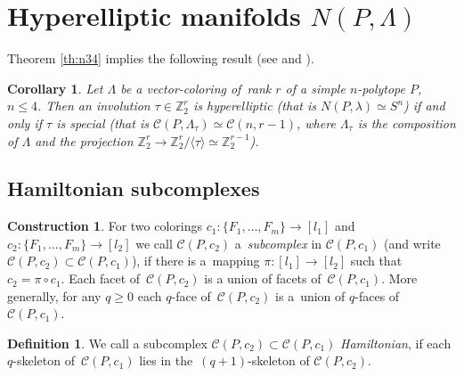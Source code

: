 \documentclass[12pt]{amsart}
\newtheorem{corollary}[formula]{Corollary}
\theoremstyle{definition}
\newtheorem{definition}[formula]{Definition}
\newtheorem{construction}[formula]{Construction}
\theoremstyle{remark}
\begin{document}
\section{Hyperelliptic manifolds $N(P,\Lambda)$}\label{sec:hyp}
Theorem \ref{th:n34} implies the following result (see \cite[Construction 8.6]{E24} and \cite[Corollary 10.8]{E24}).
\begin{corollary}
Let  $\Lambda$ be a vector-coloring of~rank $r$ of a simple $n$-polytope $P$, $n\leqslant 4$.
Then an involution $\tau\in\mathbb Z_2^r$ is hyperelliptic (that is $N(P,\lambda)\simeq S^n$)  if and only if 
$\tau$ is special (that is $\mathcal{C}(P,\Lambda_\tau)\simeq \mathcal{C}(n,r-1)$, where $\Lambda_\tau$ 
is the composition of $\Lambda$ and the projection $\mathbb Z_2^r\to\mathbb Z_2^r/\langle\tau\rangle\simeq \mathbb Z_2^{r-1}$).
\end{corollary}
\subsection{Hamiltonian subcomplexes}\label{ssec:Hams}
\begin{construction}\label{con:subcom}
For two colorings $c_1\colon\{F_1,\dots, F_m\}\to [l_1]$ and \linebreak $c_2\colon\{F_1,\dots, F_m\}\to [l_2]$
we call $\mathcal{C}(P,c_2)$ a~{\it subcomplex} in $\mathcal{C}(P,c_1)$ 
(and write $\mathcal{C}(P,c_2)\subset \mathcal{C}(P,c_1)$), if there is a~mapping 
$\pi\colon [l_1]\to[l_2]$ such that $c_2=\pi\circ c_1$. Each facet of~$\mathcal{C}(P,c_2)$ is a union of facets 
of~$\mathcal{C}(P,c_1)$. More generally, for any $q\geqslant 0$ 
each $q$-face of~$\mathcal{C}(P,c_2)$ is a~union of $q$-faces of~$\mathcal{C}(P,c_1)$.
\end{construction}
\begin{definition}\label{def:Ham}
We call a subcomplex  $\mathcal{C}(P,c_2)\subset \mathcal{C}(P,c_1)$ {\it Hamiltonian}, if each $q$-skeleton 
of~$\mathcal{C}(P,c_1)$ lies in the~$(q+1)$-skeleton of $\mathcal{C}(P,c_2)$.
\end{definition}
\end{document}
